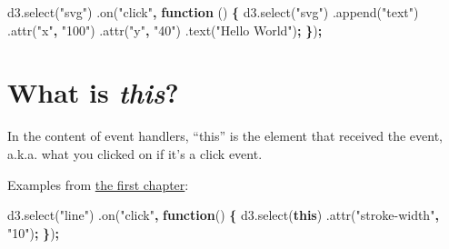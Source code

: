 \documentclass[openany]{book}
\newenvironment{Shaded}{\begin{snugshade}}{\end{snugshade}}
\newcommand{\AttributeTok}[1]{\textcolor[rgb]{0.77,0.63,0.00}{#1}}
\newcommand{\KeywordTok}[1]{\textcolor[rgb]{0.13,0.29,0.53}{\textbf{#1}}}
\newcommand{\NormalTok}[1]{#1}
\newcommand{\OperatorTok}[1]{\textcolor[rgb]{0.81,0.36,0.00}{\textbf{#1}}}
\newcommand{\StringTok}[1]{\textcolor[rgb]{0.31,0.60,0.02}{#1}}
\newcommand{\VariableTok}[1]{\textcolor[rgb]{0.00,0.00,0.00}{#1}}
\begin{document}
\begin{Shaded}
\begin{Highlighting}[]
\VariableTok{d3}\NormalTok{.}\AttributeTok{select}\NormalTok{(}\StringTok{"svg"}\NormalTok{)}
\NormalTok{  .}\AttributeTok{on}\NormalTok{(}\StringTok{"click"}\OperatorTok{,} \KeywordTok{function}\NormalTok{ () }\OperatorTok{\{}
    \VariableTok{d3}\NormalTok{.}\AttributeTok{select}\NormalTok{(}\StringTok{"svg"}\NormalTok{)}
\NormalTok{      .}\AttributeTok{append}\NormalTok{(}\StringTok{"text"}\NormalTok{)}
\NormalTok{        .}\AttributeTok{attr}\NormalTok{(}\StringTok{"x"}\OperatorTok{,} \StringTok{"100"}\NormalTok{)}
\NormalTok{        .}\AttributeTok{attr}\NormalTok{(}\StringTok{"y"}\OperatorTok{,} \StringTok{"40"}\NormalTok{)}
\NormalTok{        .}\AttributeTok{text}\NormalTok{(}\StringTok{"Hello World"}\NormalTok{)}\OperatorTok{;}
        \OperatorTok{\}}\NormalTok{)}\OperatorTok{;}
\end{Highlighting}
\end{Shaded}

\hypertarget{what-is-this}{%
\section{\texorpdfstring{What is \emph{this}?}{What is this?}}\label{what-is-this}}

In the content of event handlers, ``this'' is the element that received the event, a.k.a. what you clicked on if it's a click event.

Examples from \href{jump.html\#interactivity}{the first chapter}:

\begin{Shaded}
\begin{Highlighting}[]
\VariableTok{d3}\NormalTok{.}\AttributeTok{select}\NormalTok{(}\StringTok{"line"}\NormalTok{)}
\NormalTok{  .}\AttributeTok{on}\NormalTok{(}\StringTok{"click"}\OperatorTok{,} \KeywordTok{function}\NormalTok{() }\OperatorTok{\{}
    \VariableTok{d3}\NormalTok{.}\AttributeTok{select}\NormalTok{(}\KeywordTok{this}\NormalTok{)}
\NormalTok{      .}\AttributeTok{attr}\NormalTok{(}\StringTok{"stroke-width"}\OperatorTok{,} \StringTok{"10"}\NormalTok{)}\OperatorTok{;}
      \OperatorTok{\}}\NormalTok{)}\OperatorTok{;}
\end{Highlighting}
\end{Shaded}
\end{document}

